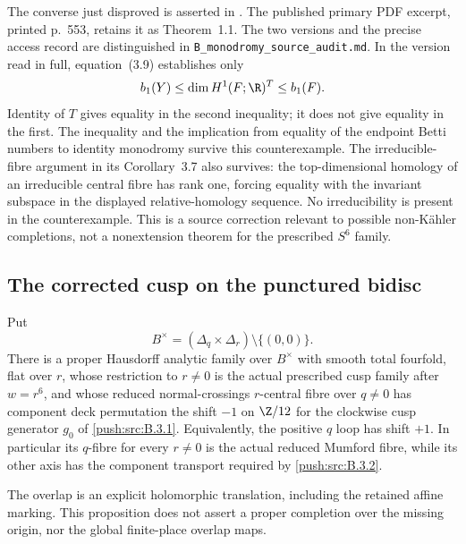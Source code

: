\begin{remark}
The converse just disproved is asserted in
\citet[Theorems 1.2 and 3.2, arXiv version~1]{HondaViaclovsky2025D}.
The published primary PDF excerpt, printed p.~553,
retains it as Theorem~1.1.  The two versions and the precise
access record are distinguished in
\texttt{B\_monodromy\_source\_audit.md}.
In the version read in full, equation~(3.9) establishes only
\[
 b_1(Y)\leq\dim H^1(F;\R)^{T}\leq b_1(F).
\]
Identity of $T$ gives equality in the second inequality;
it does not give equality in the first.  The inequality and
the implication from equality of the endpoint Betti numbers
to identity monodromy survive this counterexample.
The irreducible-fibre argument in its Corollary~3.7 also
survives: the top-dimensional homology of an irreducible
central fibre has rank one, forcing equality with the
invariant subspace in the displayed relative-homology
sequence.  No irreducibility is present in the counterexample.
This is a source correction relevant to possible
non-K\"ahler completions, not a nonextension theorem for
the prescribed $S^6$ family.
\end{remark}


\subsection{The corrected cusp on the punctured bidisc}

\begin{proposition}\label{push:src:B.4.18}
\label{push:B418}
Put
\[
 B^\times=(\Delta_q\times\Delta_r)\setminus\{(0,0)\}.
\]
There is a proper Hausdorff analytic family over
$B^\times$ with smooth total fourfold, flat over $r$,
whose restriction to $r\ne0$ is the actual prescribed
cusp family after $w=r^6$, and whose reduced
normal-crossings $r$-central fibre over $q\ne0$ has
component deck permutation the shift $-1$ on $\Z/12$
for the clockwise cusp generator $g_0$ of \ref{push:src:B.3.1}.
Equivalently, the positive $q$ loop has shift $+1$.
In particular its $q$-fibre for every $r\ne0$ is the
actual reduced Mumford fibre, while its other axis has
the component transport required by \ref{push:src:B.3.2}.

The overlap is an explicit holomorphic translation,
including the retained affine marking. This proposition
does not assert a proper completion over the missing
origin, nor the global finite-place overlap maps.
\end{proposition}


